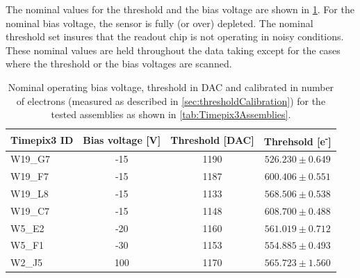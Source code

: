 The nominal values for the threshold and the bias voltage are shown in
\cref{tab:nominalBiasThreshold}. For the nominal bias voltage, the
sensor is fully (or over) depleted. The nominal threshold set insures
that the readout chip is not operating in noisy conditions. These
nominal values are held throughout the data taking except for the
cases where the threshold or the bias voltages are scanned.

\begin{table}[htbp]
  \centering
  \caption{Nominal operating bias voltage, threshold in DAC and
    calibrated in number of electrons (measured as described in
    \cref{sec:thresholdCalibration}) for the tested assemblies as
    shown in \cref{tab:Timepix3Assemblies}.}
  \label{tab:nominalBiasThreshold}
  \begin{tabular}{lccc}
    \toprule
    Timepix3 ID & Bias voltage [V] & Threshold [DAC] & Threhsold [e\textsuperscript{-}]\\
    \midrule
    W19\_G7 & -15 & 1190 & $526.230\pm0.649$ \\
    W19\_F7 & -15 & 1187 & $600.406\pm0.551$ \\
    W19\_L8 & -15 & 1133 & $568.506\pm0.538$ \\
    W19\_C7 & -15 & 1148 & $608.700\pm0.488$ \\ \hline
    W5\_E2 & -20 & 1160 & $561.019\pm0.712$ \\ \hline
    W5\_F1 & -30 & 1153 & $554.885\pm0.493$ \\ \hline
    W2\_J5 & 100 & 1170 & $565.723\pm1.560$ \\
    \bottomrule
  \end{tabular}
\end{table}



